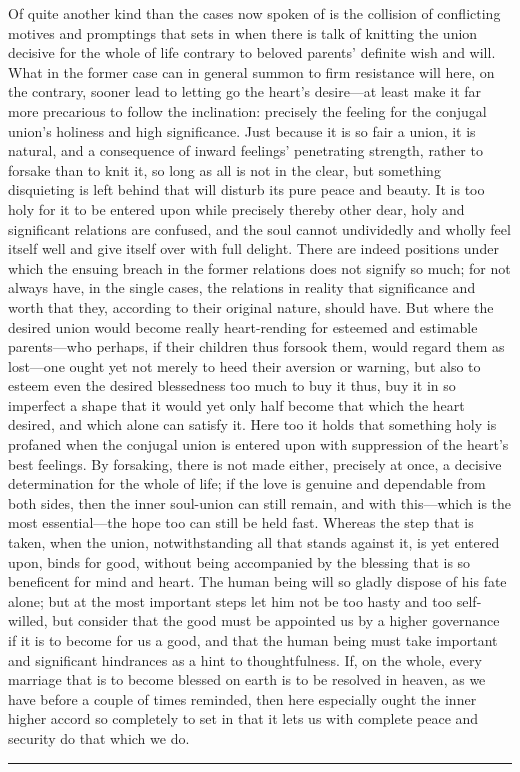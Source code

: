 \documentclass[12pt,a4paper]{book}
\begin{document}
Of quite another kind than the cases now spoken of is the collision of
conflicting motives and promptings that sets in when there is talk of
knitting the union decisive for the whole of life contrary to beloved
parents' definite wish and will. What in the former case can in general
summon to firm resistance will here, on the contrary, sooner lead to
letting go the heart's desire---at least make it far more precarious to
follow the inclination: precisely the feeling for the conjugal union's
holiness and high significance. Just because it is so fair a union, it is
natural, and a consequence of inward feelings' penetrating strength, rather
to forsake than to knit it, so long as all is not in the clear, but
something disquieting is left behind that will disturb its pure peace and
beauty. It is too holy for it to be entered upon while precisely thereby
other dear, holy and significant relations are confused, and the soul
cannot undividedly and wholly feel itself well and give itself over with
full delight. There are indeed positions under which the ensuing breach in
the former relations does not signify so much; for not always have, in the
single cases, the relations in reality that significance and worth that
they, according to their original nature, should have. But where the
desired union would become really heart-rending for esteemed and estimable
parents---who perhaps, if their children thus forsook them, would regard
them as lost---one ought yet not merely to heed their aversion or warning,
but also to esteem even the desired blessedness too much to buy it thus, buy
it in so imperfect a shape that it would yet only half become that which
the heart desired, and which alone can satisfy it. Here too it holds that
something holy is profaned when the conjugal union is entered upon with
suppression of the heart's best feelings. By forsaking, there is not made
either, precisely at once, a decisive determination for the whole of life;
if the love is genuine and dependable from both sides, then the inner
soul-union can still remain, and with this---which is the most
essential---the hope too can still be held fast. Whereas the step that is
taken, when the union, notwithstanding all that stands against it, is yet
entered upon, binds for good, without being accompanied by the blessing
that is so beneficent for mind and heart. The human being will so gladly
dispose of his fate alone; but at the most important steps let him not be
too hasty and too self-willed, but consider that the good must be appointed
us by a higher governance if it is to become for us a good, and that the
human being must take important and significant hindrances as a hint to
thoughtfulness. If, on the whole, every marriage that is to become blessed
on earth is to be resolved in heaven, as we have before a couple of times
reminded, then here especially ought the inner higher accord so completely
to set in that it lets us with complete peace and security do that which we
do.
\begin{center}\rule{0.28\linewidth}{0.4pt}\end{center}
\end{document}
